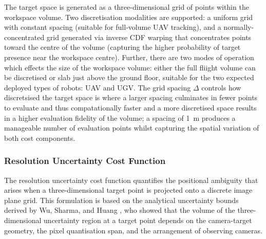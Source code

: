 The target space is generated as a three-dimensional grid of points within the workspace volume. Two discretisation modalities are supported: a uniform grid with constant spacing (suitable for full-volume \gls{UAV} tracking), and a normally-concentrated grid generated via inverse CDF warping that concentrates points toward the centre of the volume (capturing the higher probability of target presence near the workspace centre). Further, there are two modes of operation which effects the size of the workspace volume: either the full fliight volume can be discretised or slab just above the ground floor, suitable for the two expected deployed types of robots: \gls{UAV} and \gls{UGV}. The grid spacing $\Delta$ controls how discretsised the target space is where a larger spacing culminates in fewer points to evaluate and thus compatationally faster and a more discretised space results in a higher evaluation fidelity of the volume; a spacing of 1~m produces a manageable number of evaluation points whilst capturing the spatial variation of both cost components.

\subsubsection{Resolution Uncertainty Cost Function}
\label{sec:res-uncertainty}

The resolution uncertainty cost function quantifies the positional ambiguity that arises when a three-dimensional target point is projected onto a discrete image plane grid. This formulation is based on the analytical uncertainty bounds derived by Wu, Sharma, and Huang \parencite{sharmaAnalysisUncertaintyBounds1998}, who showed that the volume of the three-dimensional uncertainty region at a target point depends on the camera-target geometry, the pixel quantisation span, and the arrangement of observing cameras.

